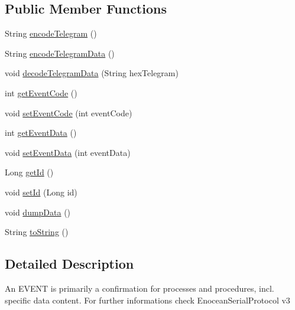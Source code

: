 \subsection*{Public Member Functions}
\begin{DoxyCompactItemize}
\item 
String \hyperlink{classch_1_1bfh_1_1gr33nopo55um_1_1enocean_1_1telegram_1_1_event_ab69f08367e723db4711c44242a8324ee}{encode\+Telegram} ()
\item 
String \hyperlink{classch_1_1bfh_1_1gr33nopo55um_1_1enocean_1_1telegram_1_1_event_a1a3451a87a9cac07d0e3640be8541fbe}{encode\+Telegram\+Data} ()
\item 
void \hyperlink{classch_1_1bfh_1_1gr33nopo55um_1_1enocean_1_1telegram_1_1_event_a9bada0cdd98d25a854a7d7382b60405f}{decode\+Telegram\+Data} (String hex\+Telegram)
\item 
int \hyperlink{classch_1_1bfh_1_1gr33nopo55um_1_1enocean_1_1telegram_1_1_event_abaf053d6cd3ba20c9597b8d4d8d3bd78}{get\+Event\+Code} ()
\item 
void \hyperlink{classch_1_1bfh_1_1gr33nopo55um_1_1enocean_1_1telegram_1_1_event_ae9266459daef3c1a73f1f17bc3180602}{set\+Event\+Code} (int event\+Code)
\item 
int \hyperlink{classch_1_1bfh_1_1gr33nopo55um_1_1enocean_1_1telegram_1_1_event_aa145ed83ad720660f878f890944642c8}{get\+Event\+Data} ()
\item 
void \hyperlink{classch_1_1bfh_1_1gr33nopo55um_1_1enocean_1_1telegram_1_1_event_a2999ad9b1f3f92b8896abdcb8ca72617}{set\+Event\+Data} (int event\+Data)
\item 
Long \hyperlink{classch_1_1bfh_1_1gr33nopo55um_1_1enocean_1_1telegram_1_1_event_a85b52f65804df97846946fc872aefa3e}{get\+Id} ()
\item 
void \hyperlink{classch_1_1bfh_1_1gr33nopo55um_1_1enocean_1_1telegram_1_1_event_a55da00c4e15b94edb99b290cfb485681}{set\+Id} (Long id)
\item 
void \hyperlink{classch_1_1bfh_1_1gr33nopo55um_1_1enocean_1_1telegram_1_1_event_a80e90c4fa91b58ad64af318551b9b7a0}{dump\+Data} ()
\item 
String \hyperlink{classch_1_1bfh_1_1gr33nopo55um_1_1enocean_1_1telegram_1_1_event_a1fcbbe38ef10bdea233d4c6886add169}{to\+String} ()
\end{DoxyCompactItemize}


\subsection{Detailed Description}
An E\+V\+E\+NT is primarily a confirmation for processes and procedures, incl. specific data content. For further informations check Enocean\+Serial\+Protocol v3

